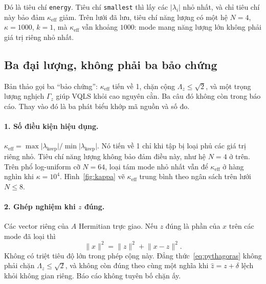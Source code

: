 \documentclass[11pt,a4paper]{article}
\newcommand{\rev}[1]{{\color{revised}#1}}
\newenvironment{revisedblock}{\par\color{revised}\ignorespaces}{\par}
\begin{document}
\begin{revisedblock}
Đó là tiêu chí \texttt{energy}.
Tiêu chí \texttt{smallest} thì lấy các \(\lvert\lambda_i\rvert\) nhỏ nhất, và chỉ tiêu chí này bảo đảm \(\kappa_{\mathrm{eff}}\) giảm.
Trên lưới đã lưu, tiêu chí năng lượng có một hệ \(N=4\), \(\kappa=1000\), \(k=1\), mà \(\kappa_{\mathrm{eff}}\) vẫn khoảng \(1000\): mode mang năng lượng lớn không phải giá trị riêng nhỏ nhất.
\end{revisedblock}

\subsection{\rev{Ba đại lượng, không phải ba bảo chứng}}

\begin{revisedblock}
Bản thảo gọi ba ``bảo chứng'': \(\kappa_{\mathrm{eff}}\) tiến về 1, chặn cộng \(\Lambda_z\le\sqrt{2}\), và một trọng lượng nghịch \(\Gamma_z\) giúp VQLS khỏi cao nguyên cằn.
Ba câu đó không còn trong báo cáo.
Thay vào đó là ba phát biểu khớp mã nguồn và số đo.

\paragraph{1. Số điều kiện hiệu dụng.}
\(\kappa_{\mathrm{eff}}=\max\lvert\lambda_{\mathrm{keep}}\rvert/\min\lvert\lambda_{\mathrm{keep}}\rvert\).
Nó tiến về 1 chỉ khi tập bị loại phủ các giá trị riêng nhỏ.
Tiêu chí năng lượng không bảo đảm điều này, như hệ \(N=4\) ở trên.
Trên phổ log-uniform cỡ \(N=64\), loại tám mode nhỏ nhất vẫn để \(\kappa_{\mathrm{eff}}\) ở hàng nghìn khi \(\kappa=10^{4}\).
Hình~\ref{fig:kappa} vẽ \(\kappa_{\mathrm{eff}}\) trung bình theo ngân sách trên lưới \(N\le 8\).

\paragraph{2. Ghép nghiệm khi \(z\) đúng.}
Các vector riêng của \(A\) Hermitian trực giao.
Nếu \(z\) đúng là phần của \(x\) trên các mode đã loại thì
\begin{equation}
  \lVert x\rVert^2 = \lVert z\rVert^2 + \lVert x-z\rVert^2.
  \label{eq:pythagoras}
\end{equation}
Không có triệt tiêu độ lớn trong phép cộng này.
Đẳng thức~\eqref{eq:pythagoras} không phải chặn \(\Lambda_z\le\sqrt{2}\), và không còn đúng theo cùng một nghĩa khi \(\hat z=z+\delta\) lệch khỏi không gian riêng.
Báo cáo không tuyên bố chặn ấy.


\end{revisedblock}
\end{document}
